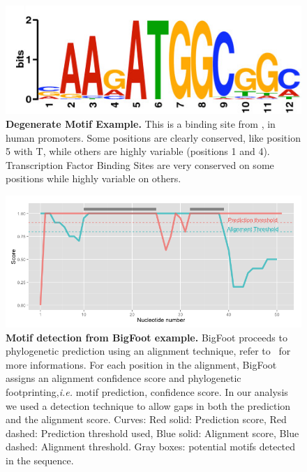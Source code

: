 \documentclass[10pt]{article}
\begin{document}
\begin{figure}[!ht]
\begin{center}
\includegraphics{Figures/DegenerateMotif.png}
\end{center}
\caption{
{\bf Degenerate Motif Example.}  This is a binding site from \citealt{whitfield_functional_2012}, in human promoters. Some positions are clearly conserved, like position 5 with T, while others are highly variable (positions 1 and 4). Transcription Factor Binding Sites are very conserved on some positions while highly variable on others.
}
\label{fig:DegenerateMotif}
\end{figure}

\begin{figure}[!ht]
\begin{center}
\includegraphics[scale=0.6]{Figures/ScoresPlot.png}
\end{center}
\caption{
{\bf Motif detection from BigFoot example.} BigFoot proceeds to phylogenetic prediction using an alignment technique, refer to~\citep{satija_bigfoot:_2009} for more informations. For each position in the alignment, BigFoot assigns an alignment confidence score and phylogenetic footprinting,\textit{i.e.} motif prediction, confidence score. In our analysis we used a detection technique to allow gaps in both the prediction and the alignment score. Curves: Red solid: Prediction score, Red dashed: Prediction threshold used, Blue solid: Alignment score, Blue dashed: Alignment threshold. Gray boxes: potential motifs detected in the sequence.
}
\label{fig:Scores}
\end{figure}


\clearpage

\end{document}
